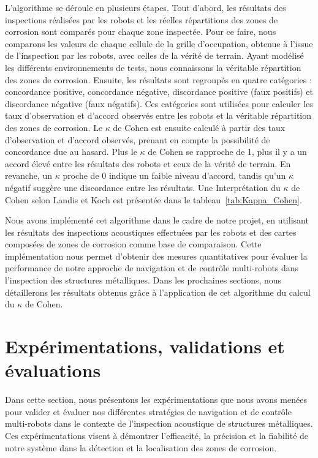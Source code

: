 \documentclass[francais,RandD]{rapportPFE}
\begin{document}
			L'algorithme se déroule en plusieurs étapes.
			Tout d'abord, les résultats des inspections réalisées par les robots et les réelles répartitions des zones de corrosion sont comparés pour chaque zone inspectée.
			Pour ce faire, nous comparons les valeurs de chaque cellule de la grille d'occupation, obtenue à l'issue de l'inspection par les robots, avec celles de la vérité de terrain.
			Ayant modélisé les différents environnements de tests, nous connaissons la véritable répartition des zones de corrosion.
			Ensuite, les résultats sont regroupés en quatre catégories : concordance positive, concordance négative, discordance positive (faux positifs) et discordance négative (faux négatifs).
			Ces catégories sont utilisées pour calculer les taux d'observation et d'accord observés entre les robots et la véritable répartition des zones de corrosion.
			Le $\kappa$ de Cohen est ensuite calculé à partir des taux d'observation et d'accord observés, prenant en compte la possibilité de concordance due au hasard.
			Plus le $\kappa$ de Cohen se rapproche de 1, plus il y a un accord élevé entre les résultats des robots et ceux de la vérité de terrain.
			En revanche, un $\kappa$ proche de 0 indique un faible niveau d'accord, tandis qu'un $\kappa$ négatif suggère une discordance entre les résultats.
			Une Interprétation du $\kappa$ de Cohen selon Landis et Koch est présentée dans le tableau~\ref{tab:Kappa_Cohen}.

			Nous avons implémenté cet algorithme dans le cadre de notre projet, en utilisant les résultats des inspections acoustiques effectuées par les robots et des cartes composées de zones de corrosion comme base de comparaison.
			Cette implémentation nous permet d'obtenir des mesures quantitatives pour évaluer la performance de notre approche de navigation et de contrôle multi-robots dans l'inspection des structures métalliques.
			Dans les prochaines sections, nous détaillerons les résultats obtenus grâce à l'application de cet algorithme du calcul du $\kappa$ de Cohen.
	\section{Expérimentations, validations et évaluations}
		Dans cette section, nous présentons les expérimentations que nous avons menées pour valider et évaluer nos différentes stratégies de navigation et de contrôle multi-robots dans le contexte de l'inspection acoustique de structures métalliques.
		Ces expérimentations visent à démontrer l'efficacité, la précision et la fiabilité de notre système dans la détection et la localisation des zones de corrosion.
\end{document}
